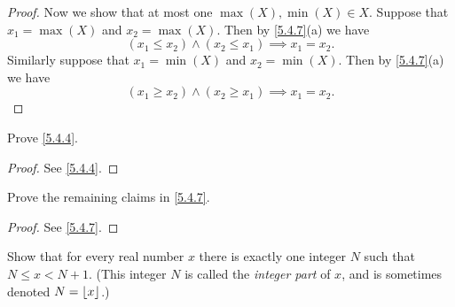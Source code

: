 \begin{proof}
  Now we show that at most one \(\max(X), \min(X) \in X\).
  Suppose that \(x_1 = \max(X)\) and \(x_2 = \max(X)\).
  Then by \cref{5.4.7}(a) we have
  \[
    (x_1 \leq x_2) \land (x_2 \leq x_1) \implies x_1 = x_2.
  \]
  Similarly suppose that \(x_1 = \min(X)\) and \(x_2 = \min(X)\).
  Then by \cref{5.4.7}(a) we have
  \[
    (x_1 \geq x_2) \land (x_2 \geq x_1) \implies x_1 = x_2.
  \]
\end{proof}

\exercisesection

\begin{ex}\label{ex:5.4.1}
  Prove \cref{5.4.4}.
\end{ex}

\begin{proof}
  See \cref{5.4.4}.
\end{proof}

\begin{ex}\label{ex:5.4.2}
  Prove the remaining claims in \cref{5.4.7}.
\end{ex}

\begin{proof}
  See \cref{5.4.7}.
\end{proof}

\begin{ex}\label{ex:5.4.3}
  Show that for every real number \(x\) there is exactly one integer \(N\) such that \(N \leq x < N + 1\).
  (This integer \(N\) is called the \emph{integer part} of \(x\), and is sometimes denoted \(N = \left\lfloor x\right\rfloor\).)
\end{ex}

